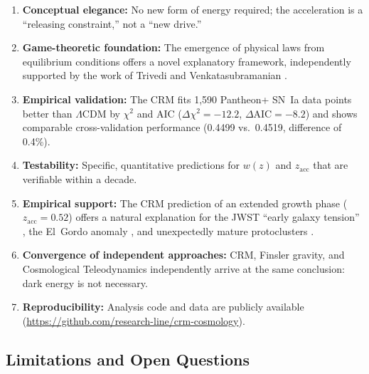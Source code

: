 \documentclass[aps,prd,twocolumn,superscriptaddress,nofootinbib]{revtex4-2}
\begin{document}
\begin{enumerate}
\item \textbf{Conceptual elegance:} No new form of energy required; the acceleration is a ``releasing constraint,'' not a ``new drive.''
\item \textbf{Game-theoretic foundation:} The emergence of physical laws from equilibrium conditions offers a novel explanatory framework, independently supported by the work of Trivedi and Venkatasubramanian \cite{Trivedi2025}.
\item \textbf{Empirical validation:} The CRM fits 1,590 Pantheon+ SN~Ia data points better than $\Lambda$CDM by $\chi^2$ and AIC ($\Delta\chi^2 = -12.2$, $\Delta\mathrm{AIC} = -8.2$) and shows comparable cross-validation performance (0.4499 vs.\ 0.4519, difference of 0.4\%).
\item \textbf{Testability:} Specific, quantitative predictions for $w(z)$ and $z_{\mathrm{acc}}$ that are verifiable within a decade.
\item \textbf{Empirical support:} The CRM prediction of an extended growth phase ($z_{\mathrm{acc}} = 0.52$) offers a natural explanation for the JWST ``early galaxy tension'' \cite{Labbe2023, BoylanKolchin2023}, the El~Gordo anomaly \cite{Asencio2023}, and unexpectedly mature protoclusters \cite{Miller2018}.
\item \textbf{Convergence of independent approaches:} CRM, Finsler gravity, and Cosmological Teleodynamics independently arrive at the same conclusion: dark energy is not necessary.
\item \textbf{Reproducibility:} Analysis code and data are publicly available (\url{https://github.com/research-line/crm-cosmology}).
\end{enumerate}

\subsection{Limitations and Open Questions}
\end{document}
